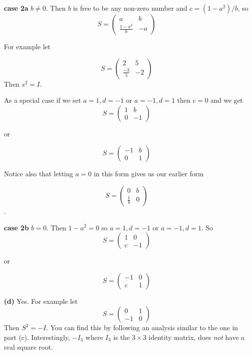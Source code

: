 \documentclass[oneside,12pt]{amsart}
\begin{document}
\smallskip

\textbf{case 2a} $b\not=0$.
Then $b$ is free to be any non-zero number and
$c=(1-a^2)/b$, so
$$
S=
\begin{pmatrix}
a & b \\
\frac{1-a^2}{b} & -a
\end{pmatrix}
$$

For example let

$$
S=
\begin{pmatrix}
2 & 5 \\
\frac{-3}{5} & -2
\end{pmatrix}
$$
Then $s^2=I$.

As a special case if we set $a=1,d=-1$ or $a=-1,d=1$ then $c=0$
and we get
$$
S=
\begin{pmatrix}
1 & b\\
0 & -1
\end{pmatrix}
$$

or

$$
S=
\begin{pmatrix}
-1 & b\\
0 & 1
\end{pmatrix}
$$

Notice also that letting $a=0$ in this form gives us our earlier form

$$
S=
\begin{pmatrix}
0 & b \\
\frac{1}{b} & 0
\end{pmatrix}
$$.

\smallskip

\textbf{case 2b} $b=0$.
Then
$1 - a^2 = 0$ so $a=1,d=-1$ or $a=-1,d=1$. So
$$
S=
\begin{pmatrix}
1 & 0\\
c & -1
\end{pmatrix}
$$

or

$$
S=
\begin{pmatrix}
-1 & 0\\
c & 1
\end{pmatrix}
$$

\smallskip

\textbf{(d)} Yes. For example let
$$
S =
\begin{pmatrix}
0  & 1 \\
-1 & 0
\end{pmatrix}
$$
Then $S^2 = -I$. You can find this by following an analysis similar to the one in
part (c). Interestingly, $-I_3$ where $I_3$ is the $3\times3$ identity matrix,
does \emph{not} have a real square root.
\end{document}
